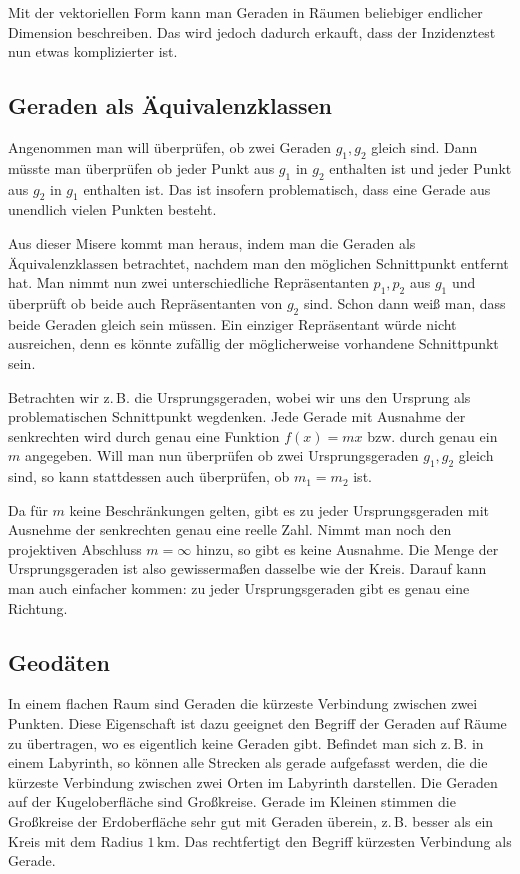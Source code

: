 \documentclass[a4paper,11pt,fleqn,twocolumn,twoside,dvipdfmx]{scrartcl}
\begin{document}
Mit der vektoriellen Form kann man Geraden in Räumen beliebiger
endlicher Dimension beschreiben. Das wird jedoch dadurch erkauft,
dass der Inzidenztest nun etwas komplizierter ist.

\subsection{Geraden als Äquivalenzklassen}

Angenommen man will überprüfen, ob zwei Geraden $g_1,g_2$ gleich sind.
Dann müsste man überprüfen ob jeder Punkt aus $g_1$ in $g_2$
enthalten ist und jeder Punkt aus $g_2$ in $g_1$ enthalten ist.
Das ist insofern problematisch, dass eine Gerade aus unendlich vielen
Punkten besteht.

Aus dieser Misere kommt man heraus, indem man die Geraden als
Äquivalenzklassen betrachtet, nachdem man den möglichen Schnittpunkt
entfernt hat. Man nimmt nun zwei unterschiedliche Repräsentanten
$p_1,p_2$ aus $g_1$ und überprüft ob beide auch Repräsentanten
von $g_2$ sind. Schon dann weiß man, dass beide Geraden gleich
sein müssen. Ein einziger Repräsentant würde nicht ausreichen, denn
es könnte zufällig der möglicherweise vorhandene Schnittpunkt sein.

Betrachten wir z.\,B. die Ursprungsgeraden, wobei wir uns den
Ursprung als problematischen Schnittpunkt wegdenken. Jede Gerade
mit Ausnahme der senkrechten wird durch genau eine Funktion
$f(x)=mx$ bzw. durch genau ein $m$ angegeben.
Will man nun überprüfen ob zwei Ursprungsgeraden $g_1,g_2$ gleich
sind, so kann stattdessen auch überprüfen, ob $m_1=m_2$ ist.

Da für $m$ keine Beschränkungen gelten, gibt es zu jeder
Ursprungsgeraden mit Ausnehme der senkrechten genau eine reelle Zahl.
Nimmt man noch den projektiven Abschluss $m=\infty$ hinzu, so
gibt es keine Ausnahme. Die Menge der Ursprungsgeraden ist also
gewissermaßen dasselbe wie der Kreis. Darauf kann man auch einfacher
kommen: zu jeder Ursprungsgeraden gibt es genau eine Richtung.


\subsection{Geodäten}

In einem flachen Raum sind Geraden die kürzeste Verbindung zwischen
zwei Punkten. Diese Eigenschaft ist dazu geeignet den Begriff der
Geraden auf Räume zu übertragen, wo es eigentlich keine Geraden
gibt. Befindet man sich z.\,B. in einem Labyrinth, so können alle
Strecken als gerade aufgefasst werden, die die kürzeste Verbindung
zwischen zwei Orten im Labyrinth darstellen. Die Geraden auf der
Kugeloberfläche sind Großkreise. Gerade im Kleinen stimmen die
Großkreise der Erdoberfläche sehr gut mit Geraden überein,
z.\,B. besser als ein Kreis mit dem Radius $1\,\mathrm{km}$.
Das rechtfertigt den Begriff kürzesten Verbindung als Gerade.
\end{document}
